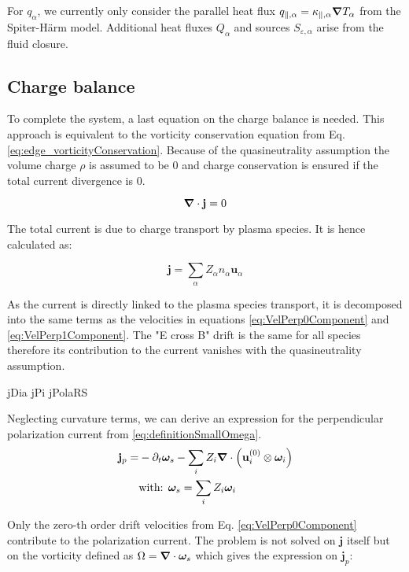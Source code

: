 For $q_\alpha$, we currently only consider the parallel heat flux $q_{\parallel,\alpha} = \kappa_{\parallel,\alpha}\grad T_\alpha$ from the Spiter-Härm model. Additional heat fluxes $Q_\alpha$ and sources $S_{\varepsilon,\alpha}$ arise from the fluid closure.



\subsection{Charge balance}

To complete the system, a last equation on the charge balance is needed. This approach is equivalent to the vorticity conservation equation from Eq. \ref{eq:edge_vorticityConservation}. Because of the quasineutrality assumption the volume charge $\rho$ is assumed to be 0 and charge conservation is ensured if the total current divergence is 0.

\begin{equation}
	\grad\cdot\mathbf{j} = 0
\end{equation}

The total current is due to charge transport by plasma species. It is hence calculated as: 

\begin{equation}
	\mathbf{j} = \sum_{\alpha} Z_\alpha n_\alpha \mathbf{u}_\alpha
\end{equation}

As the current is directly linked to the plasma species transport, it is decomposed into the same terms as the velocities in equations \ref{eq:VelPerp0Component} and \ref{eq:VelPerp1Component}. The "E cross B" drift is the same for all species therefore its contribution to the current vanishes with the quasineutrality assumption. 

jDia
jPi
jPolaRS



Neglecting curvature terms, we can derive an expression for the perpendicular polarization current from \autoref{eq:definitionSmallOmega}.
\begin{align}
	\mathbf{j}_{p} =& -\partial_t\boldsymbol{\omega}_s - \sum_{i}Z_i\grad\cdot\left(\mathbf{u}^{(0)}_i\otimes\boldsymbol{\omega}_i\right) \\
	&\text{with:  }\boldsymbol{\omega}_s = \sum_{i}Z_i\boldsymbol{\omega}_i \nonumber
\end{align}


 Only the zero-th order drift velocities from Eq. \ref{eq:VelPerp0Component} contribute to the polarization current. The problem is not solved on $\mathbf{j}$ itself but on the vorticity defined as $\Omega = \grad\cdot\boldsymbol{\omega}_s$ which gives the expression on $\mathbf{j}_p$: 
 
